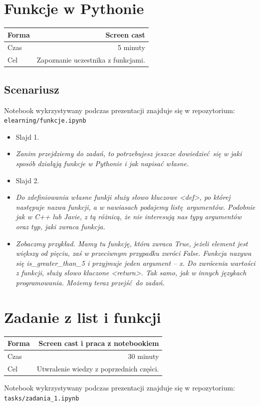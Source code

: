 \documentclass{mwart}
\begin{document}
\section{Funkcje w Pythonie}
\begin{center}
  \begin{tabular}{lr}
    \toprule
    Forma & Screen cast \\
    \midrule
    Czas & 5 minuty \\
    Cel & Zapoznanie uczestnika z funkcjami. \\
    \bottomrule
  \end{tabular}
\end{center}

\subsection{Scenariusz}
Notebook wykrzystywany podczas prezentacji znajduje się w repozytorium:
\texttt{elearning/funkcje.ipynb}
\begin{itemize}
  \item Slajd 1.
  \item \emph{Zanim przejdziemy do zadań, to potrzebujesz jeszcze dowiedzieć się w jaki
      sposób działąją funkcje w Pythonie i jak napisać własne.}
  \item Slajd 2.
  \item \emph{Do zdefiniowania własne funkji służy słowo kluczowe <def>, po której
      następuje nazwa funkcji, a w nawiasach podajemy listę argumentów. Podobnie jak w
      C++ lub Javie, z tą różnicą, że nie interesują nas typy argumentów oraz typ, jaki
      zwraca funkcja.}
  \item \emph{Zobaczmy przykład. Mamy tu funkcję, która zwraca True, jeżeli element jest
      większy od pięciu, zaś w przeciwnym przypadku zwróci False. Funkcja nazywa się
      is\_greater\_than\_5 i przyjmuje jeden argument --  x. Do zwrócenia wartości z
      funkcji, służy słowo kluczone <return>. Tak samo, jak w innych językach
      programowania. Możemy teraz przejść do zadań.}
\end{itemize}

\section{Zadanie z list i funkcji}
\begin{center}
  \begin{tabular}{lr}
    \toprule
    Forma & Screen cast i praca z notebookiem \\
    \midrule
    Czas & 30 minuty \\
    Cel & Utwralenie wiedzy z poprzednich części. \\
    \bottomrule
  \end{tabular}
\end{center}
Notebook wykrzystywany podczas prezentacji znajduje się w repozytorium:
\texttt{tasks/zadania\_1.ipynb}
\end{document}
